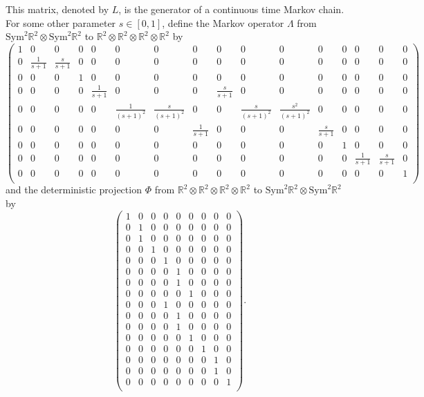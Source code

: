 \documentclass[12pt]{ximera}
\begin{document}
This matrix, denoted by $L$, is the generator of a continuous time Markov chain. 
For some other parameter $s\in [0,1]$, define the Markov operator $\Lambda$ from $\mathrm{Sym}^2\mathbb{R}^2 \otimes \mathrm{Sym}^2\mathbb{R}^2 $ to $\mathbb{R}^2 \otimes \mathbb{R}^2 \otimes \mathbb{R}^2 \otimes \mathbb{R}^2 $ by 
$$
\left(
\begin{array}{cccccccccccccccc}
 1 & 0 & 0 & 0 & 0 & 0 & 0 & 0 & 0 & 0 & 0 & 0 & 0 & 0 & 0 & 0 \\
 0 & \frac{1}{s+1} & \frac{s}{s+1} & 0 & 0 & 0 & 0 & 0 & 0 & 0 & 0 & 0 & 0 & 0 & 0 &
   0 \\
 0 & 0 & 0 & 1 & 0 & 0 & 0 & 0 & 0 & 0 & 0 & 0 & 0 & 0 & 0 & 0 \\
 0 & 0 & 0 & 0 & \frac{1}{s+1} & 0 & 0 & 0 & \frac{s}{s+1} & 0 & 0 & 0 & 0 & 0 & 0 &
   0 \\
 0 & 0 & 0 & 0 & 0 & \frac{1}{(s+1)^2} & \frac{s}{(s+1)^2} & 0 & 0 &
   \frac{s}{(s+1)^2} & \frac{s^2}{(s+1)^2} & 0 & 0 & 0 & 0 & 0 \\
 0 & 0 & 0 & 0 & 0 & 0 & 0 & \frac{1}{s+1} & 0 & 0 & 0 & \frac{s}{s+1} & 0 & 0 & 0 &
   0 \\
 0 & 0 & 0 & 0 & 0 & 0 & 0 & 0 & 0 & 0 & 0 & 0 & 1 & 0 & 0 & 0 \\
 0 & 0 & 0 & 0 & 0 & 0 & 0 & 0 & 0 & 0 & 0 & 0 & 0 & \frac{1}{s+1} & \frac{s}{s+1} &
   0 \\
 0 & 0 & 0 & 0 & 0 & 0 & 0 & 0 & 0 & 0 & 0 & 0 & 0 & 0 & 0 & 1 \\
\end{array}
\right)
$$
and the deterministic projection $\Phi$ from $\mathbb{R}^2 \otimes \mathbb{R}^2 \otimes \mathbb{R}^2 \otimes \mathbb{R}^2 $ to $\mathrm{Sym}^2\mathbb{R}^2 \otimes \mathrm{Sym}^2\mathbb{R}^2 $ by 
$$
\left(
\begin{array}{ccccccccc}
 1 & 0 & 0 & 0 & 0 & 0 & 0 & 0 & 0 \\
 0 & 1 & 0 & 0 & 0 & 0 & 0 & 0 & 0 \\
 0 & 1 & 0 & 0 & 0 & 0 & 0 & 0 & 0 \\
 0 & 0 & 1 & 0 & 0 & 0 & 0 & 0 & 0 \\
 0 & 0 & 0 & 1 & 0 & 0 & 0 & 0 & 0 \\
 0 & 0 & 0 & 0 & 1 & 0 & 0 & 0 & 0 \\
 0 & 0 & 0 & 0 & 1 & 0 & 0 & 0 & 0 \\
 0 & 0 & 0 & 0 & 0 & 1 & 0 & 0 & 0 \\
 0 & 0 & 0 & 1 & 0 & 0 & 0 & 0 & 0 \\
 0 & 0 & 0 & 0 & 1 & 0 & 0 & 0 & 0 \\
 0 & 0 & 0 & 0 & 1 & 0 & 0 & 0 & 0 \\
 0 & 0 & 0 & 0 & 0 & 1 & 0 & 0 & 0 \\
 0 & 0 & 0 & 0 & 0 & 0 & 1 & 0 & 0 \\
 0 & 0 & 0 & 0 & 0 & 0 & 0 & 1 & 0 \\
 0 & 0 & 0 & 0 & 0 & 0 & 0 & 1 & 0 \\
 0 & 0 & 0 & 0 & 0 & 0 & 0 & 0 & 1 \\
\end{array}
\right).
$$
\end{document}
